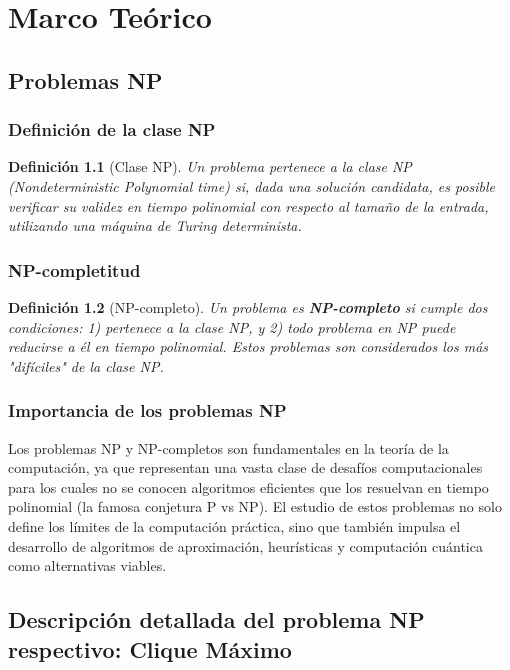 \documentclass[12pt,a4paper]{report}
\newtheorem{definicion}{Definición}[chapter]
\begin{document}
\newpage

\chapter{Marco Teórico}

\section{Problemas NP}
\subsection{Definición de la clase NP}
\begin{definicion}[Clase NP]
Un problema pertenece a la clase NP (Nondeterministic Polynomial time) si, dada una solución candidata, es posible verificar su validez en tiempo polinomial con respecto al tamaño de la entrada, utilizando una máquina de Turing determinista.
\end{definicion}

\subsection{NP-completitud}
\begin{definicion}[NP-completo]
Un problema es \textbf{NP-completo} si cumple dos condiciones: 1) pertenece a la clase NP, y 2) todo problema en NP puede reducirse a él en tiempo polinomial. Estos problemas son considerados los más "difíciles" de la clase NP.
\end{definicion}

\subsection{Importancia de los problemas NP}
Los problemas NP y NP-completos son fundamentales en la teoría de la computación, ya que representan una vasta clase de desafíos computacionales para los cuales no se conocen algoritmos eficientes que los resuelvan en tiempo polinomial (la famosa conjetura P vs NP). El estudio de estos problemas no solo define los límites de la computación práctica, sino que también impulsa el desarrollo de algoritmos de aproximación, heurísticas y computación cuántica como alternativas viables.

\section{Descripción detallada del problema NP respectivo: Clique Máximo}
\end{document}
